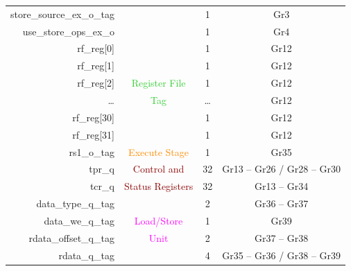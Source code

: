 \begin{table}[t]
\begin{tabular}{@{}rccc@{}}
        store\_source\_ex\_o\_tag       &                                       & 1      & Gr3                         \\
        use\_store\_ops\_ex\_o          &                                       & 1      & Gr4                         \\\hdashline
        rf\_reg[0]                      &                                       & 1      & Gr12                        \\
        rf\_reg[1]                      &                                       & 1      & Gr12                        \\
        rf\_reg[2]                      & \textcolor{LimeGreen}{Register File}  & 1      & Gr12                        \\
        \ldots                          & \textcolor{LimeGreen}{Tag}            & \ldots & Gr12                        \\
        rf\_reg[30]                     &                                       & 1      & Gr12                        \\
        rf\_reg[31]                     &                                       & 1      & Gr12                        \\\hdashline
        rs1\_o\_tag                     & \textcolor{DarkOrange}{Execute Stage} & 1      & Gr35                        \\\hdashline
        tpr\_q                          & \textcolor{DarkRed}{Control and}      & 32     & Gr13 -- Gr26 / Gr28 -- Gr30   \\
        tcr\_q                          & \textcolor{DarkRed}{Status Registers} & 32     & Gr13 -- Gr34                 \\\hdashline
        data\_type\_q\_tag              &                                       & 2      & Gr36 -- Gr37                 \\
        data\_we\_q\_tag                & \textcolor{magenta}{Load/Store}       & 1      & Gr39                        \\
        rdata\_offset\_q\_tag           & \textcolor{magenta}{Unit}             & 2      & Gr37 -- Gr38                 \\
        rdata\_q\_tag                   &                                       & 4      & Gr35 -- Gr36 / Gr38 -- Gr39   \\
        \bottomrule
    \end{tabular}
\end{table}


